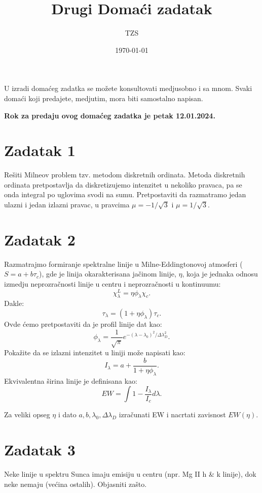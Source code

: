 \documentclass[12pt]{article}
\title{Drugi Doma\'{c}i zadatak}
\author{TZS}
\date{\today}
\begin{document}
\maketitle

U izradi doma\'{c}eg zadatka se mo\v{z}ete konsultovati medjusobno i sa mnom. Svaki doma\'{c}i koji predajete, medjutim, mora biti samostalno napisan. 

\textbf{Rok za predaju ovog doma\'{c}eg zadatka je petak 12.01.2024.}

\section*{Zadatak 1}

Re\v{s}iti Milneov problem tzv. metodom diskretnih ordinata. Metoda diskretnih ordinata pretpostavlja da diskretizujemo intenzitet u nekoliko pravaca, pa se onda integral po uglovima svodi na sumu. Pretpostaviti da razmatramo jedan ulazni i jedan izlazni pravac, u pravcima $\mu=-1/\sqrt{3}$ i $\mu=1/\sqrt{3}$. 

\section*{Zadatak 2}

Razmatrajmo formiranje spektralne linije u Milne-Eddingtonovoj atmosferi ($S=a+b \tau_c$), gde je linija okarakterisana ja\v{c}inom linije, $\eta$, koja je jednaka odnosu izmedju neprozra\v{c}nosti linije u centru i neprozra\v{c}nosti u kontinuumu:
\begin{equation}
\chi_\lambda^L = \eta \phi_\lambda \chi_c.
\end{equation}
Dakle:
\begin{equation}
\tau_\lambda = (1+\eta \phi_\lambda) \tau_c.
\end{equation}
Ovde \'{c}emo pretpostaviti da je profil linije dat kao:
\begin{equation}
\phi_\lambda = \frac{1}{\sqrt{\pi}} e^{-(\lambda-\lambda_0)^2/\Delta\lambda_D^2}.
\end{equation}
Poka\v{z}ite da se izlazni intenzitet u liniji mo\v{z}e napisati kao: 
\begin{equation}
I_\lambda = a + \frac{b}{1+\eta \phi_\lambda}.
\end{equation}
Ekvivalentna \v{s}irina linije je definisana kao:
\begin{equation}
EW = \int 1 - \frac{I_\lambda}{I_c} d\lambda.
\end{equation}

Za veliki opseg $\eta$ i dato $a,b,\lambda_0, \Delta\lambda_D$ izra\v{c}unati EW i nacrtati zavisnost $EW(\eta)$.

\section*{Zadatak 3}

Neke linije u spektru Sunca imaju emisiju u centru (npr. Mg II h \& k linije), dok neke nemaju (ve\'{c}ina ostalih). Objasniti za\v{s}to.
\end{document}
